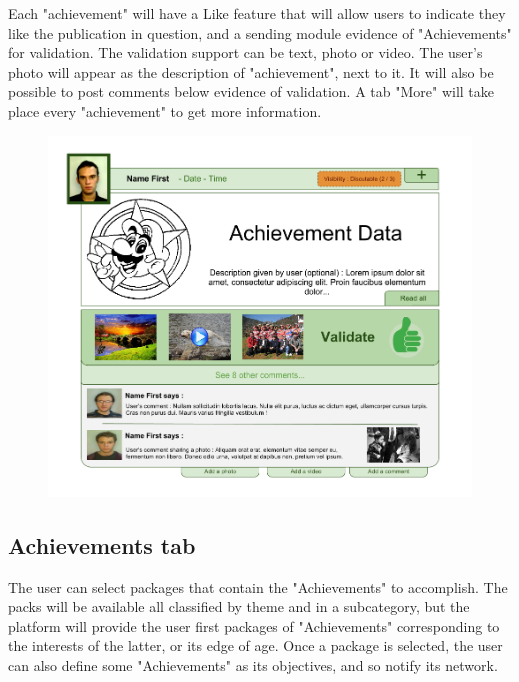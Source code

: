 \documentclass{life-fr}
\begin{document}
Each "achievement" will have a Like feature that will allow users to indicate they like the publication in question, and a sending module evidence of "Achievements" for validation. The validation support can be text, photo or video. The user's photo will appear as the description of "achievement", next to it. It will also be possible to post comments below evidence of validation. A tab "More" will take place every "achievement" to get more information.\\

\begin{figure}[H]
  \begin{center}
    \includegraphics[width=15cm]{img/achievement.png}
  \end{center}
\end{figure}

\subsection{Achievements tab}

The user can select packages that contain the "Achievements" to accomplish. The packs will be available all classified by theme and in a subcategory, but the platform will provide the user first packages of "Achievements" corresponding to the interests of the latter, or its edge of age. Once a package is selected, the user can also define some "Achievements" as its objectives, and so notify its network.

\newpage
\end{document}
